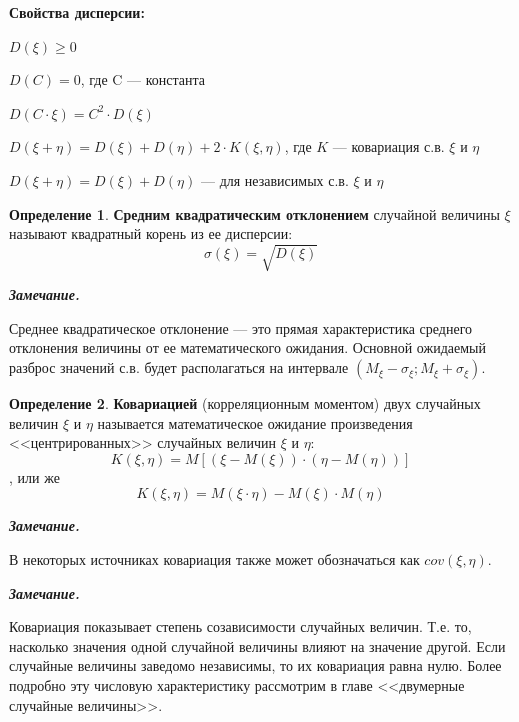 \documentclass[12pt,a4paper]{article}
\newcommand{\deglistwithtitle}[2]{%
    \noindent\textbf{#1}\par\vspace{0.3em}
    \begin{deglist}
        #2
    \end{deglist}
}
\theoremstyle{definition}
\newtheorem{definition}{Определение}[section]
\theoremstyle{definition}
\theoremstyle{remark}
\newenvironment{remark}{
  \par\noindent\textbf{\textit{Замечание.}}~
}{\par}
\theoremstyle{corollary}
\newcommand{\nextblock}{\vspace{1.5em}\noindent}
\theoremstyle{bolditalic}
\begin{document}
\nextblock

\deglistwithtitle{Свойства дисперсии:}{
    \item $D(\xi) \ge 0$
    \item $D(C) = 0$, где C --- константа
    \item $D(C\cdot \xi)=C^2\cdot D(\xi)$
    \item $D(\xi + \eta) = D(\xi) + D(\eta) + 2\cdot K(\xi, \eta)$, где $K$ --- ковариация с.в. $\xi$ и $\eta$
    \item $D(\xi + \eta) = D(\xi) + D(\eta)$ --- для независимых с.в. $\xi$ и $\eta$
}

\nextblock

\begin{definition}
    \textbf{Средним квадратическим отклонением} случайной величины $\xi$ называют квадратный корень из ее дисперсии:
    \[
    \sigma(\xi)=\sqrt{D(\xi)}
    \]
\end{definition}

\begin{remark}
    Среднее квадратическое отклонение --- это прямая характеристика среднего отклонения величины от ее математического ожидания. Основной ожидаемый разброс значений с.в. будет располагаться на интервале $(M_\xi - \sigma_\xi; M_\xi + \sigma_\xi)$.
\end{remark}

\nextblock

\begin{definition}
    \textbf{Ковариацией} (корреляционным моментом) двух случайных величин $\xi$ и $\eta$ называется математическое ожидание произведения <<центрированных>> случайных величин $\xi$ и $\eta$:
    \[
    K(\xi, \eta) = M[(\xi-M(\xi))\cdot(\eta-M(\eta))]
    \], или же
    \[
    K(\xi, \eta) = M(\xi \cdot \eta) - M(\xi)\cdot M(\eta)
    \]
\end{definition}

\begin{remark}
    В некоторых источниках ковариация также может обозначаться как $cov(\xi, \eta)$.
\end{remark}
\begin{remark}
    Ковариация показывает степень созависимости случайных величин. Т.е. то, насколько значения одной случайной величины влияют на значение другой. Если случайные величины заведомо независимы, то их ковариация равна нулю. Более подробно эту числовую характеристику рассмотрим в главе <<двумерные случайные величины>>.
\end{remark}
\end{document}
